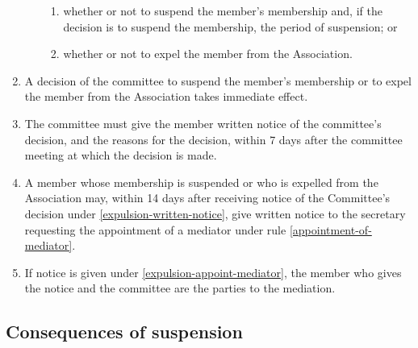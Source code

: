 \documentclass[../constitution.tex]{subfiles}
\begin{document}
\begin{enumerate}
\begin{enumerate}
\begin{enumerate}
    \item whether or not to suspend the member's membership and, if the decision is to suspend the membership, the period of suspension; or
    \item whether or not to expel the member from the Association.
    \end{enumerate}
  \end{enumerate}
\item A decision of the committee to suspend the member's membership or to expel the member from the Association takes immediate effect.
\item The committee must give the member written notice of the committee's decision, and the reasons for the decision, within 7 days after the committee meeting at which the decision is made. \label{expulsion-written-notice}
\item A member whose membership is suspended or who is expelled from the Association may, within 14 days after receiving notice of the Committee's decision under  \ref{expulsion-written-notice}, give written notice to the secretary requesting the appointment of a mediator under rule \ref{appointment-of-mediator}. \label{expulsion-appoint-mediator}
\item If notice is given under  \ref{expulsion-appoint-mediator}, the member who gives the notice and the committee are the parties to the mediation.
\end{enumerate}

\hypertarget{consequences-of-suspension}{%
\subsection{Consequences of suspension}\label{consequences-of-suspension}}
\end{document}
